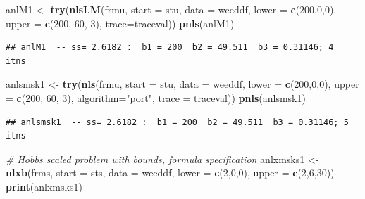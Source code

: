 \documentclass[
]{article}
\newenvironment{Shaded}{\begin{snugshade}}{\end{snugshade}}
\newcommand{\AttributeTok}[1]{\textcolor[rgb]{0.13,0.29,0.53}{#1}}
\newcommand{\CommentTok}[1]{\textcolor[rgb]{0.56,0.35,0.01}{\textit{#1}}}
\newcommand{\DecValTok}[1]{\textcolor[rgb]{0.00,0.00,0.81}{#1}}
\newcommand{\FunctionTok}[1]{\textcolor[rgb]{0.13,0.29,0.53}{\textbf{#1}}}
\newcommand{\NormalTok}[1]{#1}
\newcommand{\OtherTok}[1]{\textcolor[rgb]{0.56,0.35,0.01}{#1}}
\newcommand{\StringTok}[1]{\textcolor[rgb]{0.31,0.60,0.02}{#1}}
\begin{document}
\begin{Shaded}
\begin{Highlighting}[]
\NormalTok{anlM1 }\OtherTok{\textless{}{-}} \FunctionTok{try}\NormalTok{(}\FunctionTok{nlsLM}\NormalTok{(frmu, }\AttributeTok{start =}\NormalTok{ stu, }\AttributeTok{data =}\NormalTok{ weeddf, }\AttributeTok{lower =} \FunctionTok{c}\NormalTok{(}\DecValTok{200}\NormalTok{,}\DecValTok{0}\NormalTok{,}\DecValTok{0}\NormalTok{), }
            \AttributeTok{upper =} \FunctionTok{c}\NormalTok{(}\DecValTok{200}\NormalTok{, }\DecValTok{60}\NormalTok{, }\DecValTok{3}\NormalTok{), }\AttributeTok{trace=}\NormalTok{traceval))}
\FunctionTok{pnls}\NormalTok{(anlM1)}
\end{Highlighting}
\end{Shaded}

\begin{verbatim}
## anlM1  -- ss= 2.6182 :  b1 = 200  b2 = 49.511  b3 = 0.31146; 4  itns
\end{verbatim}

\begin{Shaded}
\begin{Highlighting}[]
\NormalTok{anlsmsk1 }\OtherTok{\textless{}{-}} \FunctionTok{try}\NormalTok{(}\FunctionTok{nls}\NormalTok{(frmu, }\AttributeTok{start =}\NormalTok{ stu, }\AttributeTok{data =}\NormalTok{ weeddf, }\AttributeTok{lower =} \FunctionTok{c}\NormalTok{(}\DecValTok{200}\NormalTok{,}\DecValTok{0}\NormalTok{,}\DecValTok{0}\NormalTok{), }
        \AttributeTok{upper =} \FunctionTok{c}\NormalTok{(}\DecValTok{200}\NormalTok{, }\DecValTok{60}\NormalTok{, }\DecValTok{3}\NormalTok{),  }\AttributeTok{algorithm=}\StringTok{"port"}\NormalTok{, }\AttributeTok{trace =}\NormalTok{ traceval))}
\FunctionTok{pnls}\NormalTok{(anlsmsk1)}
\end{Highlighting}
\end{Shaded}

\begin{verbatim}
## anlsmsk1  -- ss= 2.6182 :  b1 = 200  b2 = 49.511  b3 = 0.31146; 5  itns
\end{verbatim}

\begin{Shaded}
\begin{Highlighting}[]
\CommentTok{\# Hobbs scaled problem with bounds, formula specification}
\NormalTok{anlxmsks1 }\OtherTok{\textless{}{-}} \FunctionTok{nlxb}\NormalTok{(frms, }\AttributeTok{start =}\NormalTok{ sts, }\AttributeTok{data =}\NormalTok{ weeddf, }\AttributeTok{lower =} \FunctionTok{c}\NormalTok{(}\DecValTok{2}\NormalTok{,}\DecValTok{0}\NormalTok{,}\DecValTok{0}\NormalTok{),}
                  \AttributeTok{upper =} \FunctionTok{c}\NormalTok{(}\DecValTok{2}\NormalTok{,}\DecValTok{6}\NormalTok{,}\DecValTok{30}\NormalTok{))}
\FunctionTok{print}\NormalTok{(anlxmsks1)}
\end{Highlighting}
\end{Shaded}
\end{document}
